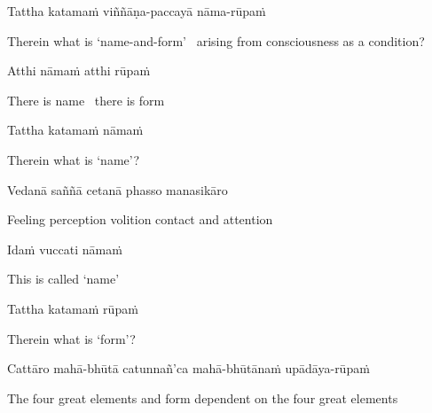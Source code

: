 Tattha katamaṁ viññāṇa-paccayā nāma-rūpaṁ

\begin{english-hang}
  Therein what is `name-and-form' \breathmark\ arising from consciousness as a condition?
\end{english-hang}

Atthi nāmaṁ atthi rūpaṁ

\begin{english}
  There is name \breathmark\ there is form
\end{english}

Tattha katamaṁ nāmaṁ

\begin{english}
  Therein what is `name'?
\end{english}

Vedanā saññā cetanā phasso manasikāro\makeatletter\hyperlink{endnote80-appendix}\makeatother

\begin{english}
  Feeling perception volition contact and attention
\end{english}

Idaṁ vuccati nāmaṁ

\begin{english}
  This is called `name'
\end{english}

Tattha katamaṁ rūpaṁ

\begin{english}
  Therein what is `form'?
\end{english}

\ifninebythirteen\clearpage\fi

\begin{pali-hang}
Cattāro mahā-bhūtā catunnañ'ca mahā-bhūtānaṁ upādāya-rūpaṁ
\end{pali-hang}

\begin{english-hang}
  The four great elements and form dependent on the four great elements
\end{english-hang}

